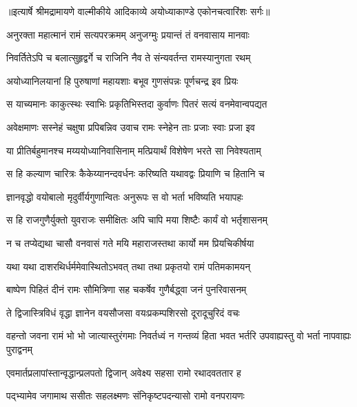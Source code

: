{॥इत्यार्षे श्रीमद्रामायणे वाल्मीकीये आदिकाव्ये अयोध्याकाण्डे एकोनचत्वारिंशः सर्गः॥}


\twolineshloka
{अनुरक्ता महात्मानं रामं सत्यपरक्रमम्}
{अनुजग्मुः प्रयान्तं तं वनवासाय मानवाः} %

\twolineshloka
{निवर्तितेऽपि च बलात्सुहृद्वर्गे च राजिनि}
{नैव ते संन्यवर्तन्त रामस्यानुगता रथम्} %

\twolineshloka
{अयोध्यानिलयानां हि पुरुषाणां महायशाः}
{बभूव गुणसंपन्नः पूर्णचन्द्र इव प्रियः} %

\twolineshloka
{स याच्यमानः काकुत्स्थः स्वाभिः प्रकृतिभिस्तदा}
{कुर्वाणः पितरं सत्यं वनमेवान्वपद्यत} %

\twolineshloka
{अवेक्षमाणः सस्नेहं चक्षुषा प्रपिबन्निव}
{उवाच रामः स्नेहेन ताः प्रजाः स्वाः प्रजा इव} %

\twolineshloka
{या प्रीतिर्बहुमानश्च मय्ययोध्यानिवासिनाम्}
{मत्प्रियार्थं विशेषेण भरते सा निवेश्यताम्} %

\twolineshloka
{स हि कल्याण चारित्रः कैकेय्यानन्दवर्धनः}
{करिष्यति यथावद्वः प्रियाणि च हितानि च} %

\twolineshloka
{ज्ञानवृद्धो वयोबालो मृदुर्वीर्यगुणान्वितः}
{अनुरूपः स वो भर्ता भविष्यति भयापहः} %

\twolineshloka
{स हि राजगुणैर्युक्तो युवराजः समीक्षितः}
{अपि चापि मया शिष्टैः कार्यं वो भर्तृशासनम्} %

\twolineshloka
{न च तप्येद्यथा चासौ वनवासं गते मयि}
{महाराजस्तथा कार्यो मम प्रियचिकीर्षया} %

\twolineshloka
{यथा यथा दाशरथिर्धर्ममेवास्थितोऽभवत्}
{तथा तथा प्रकृतयो रामं पतिमकामयन्} %

\twolineshloka
{बाष्पेण पिहितं दीनं रामः सौमित्रिणा सह}
{चकर्षेव गुणैर्बद्ध्वा जनं पुनरिवासनम्} %

\twolineshloka
{ते द्विजास्त्रिविधं वृद्धा ज्ञानेन वयसौजसा}
{वयःप्रकम्पशिरसो दूरादूचुरिदं वचः} %

\threelineshloka
{वहन्तो जवना रामं भो भो जात्यास्तुरंगमाः}
{निवर्तध्वं न गन्तव्यं हिता भवत भर्तरि}
{उपवाह्यस्तु वो भर्ता नापवाह्यः पुराद्वनम्} %

\twolineshloka
{एवमार्तप्रलापांस्तान्वृद्धान्प्रलपतो द्विजान्}
{अवेक्ष्य सहसा रामो रथादवततार ह} %

\twolineshloka
{पद्भ्यामेव जगामाथ ससीतः सहलक्ष्मणः}
{संनिकृष्टपदन्यासो रामो वनपरायणः} %

